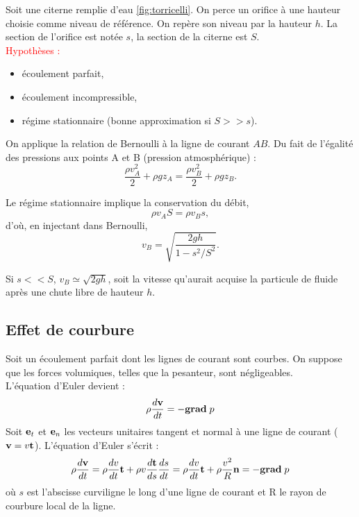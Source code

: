 \documentclass[11pt,a4paper]{report}
\begin{document}
Soit une citerne remplie d'eau \ref{fig:torricelli}. On perce un orifice à une hauteur choisie comme niveau de référence. On repère son niveau par la hauteur $h$. La section  de l'orifice est notée $s$, la section de la citerne est $S$.\\

\textcolor{red}{Hypothèses :}
\begin{itemize}
	\item écoulement parfait,
	\item écoulement incompressible,
	\item régime stationnaire (bonne approximation si $S >> s$).
\end{itemize}

On applique la relation de Bernoulli à la ligne de courant $AB$. Du fait de l'égalité des pressions aux points A et B (pression atmosphérique) :
\begin{equation}
	\frac{\rho v_A^2}{2} + \rho g z_A = \frac{\rho v_B^2}{2} + \rho g z_B.
\end{equation}

Le régime stationnaire implique la conservation du débit,
\begin{equation}
	\rho v_A S = \rho v_B s,
\end{equation}
d'où, en injectant dans Bernoulli,
\begin{equation}
	v_B = \sqrt{\frac{2gh}{1 - s^2/S^2}}.
\end{equation}

Si $s << S$, $v_B \simeq \sqrt{2gh}$, soit la vitesse qu'aurait acquise la particule de fluide après une chute libre de hauteur $h$.

\subsection{Effet de courbure}
Soit un écoulement parfait dont les lignes de courant sont courbes. On suppose que les forces volumiques, telles que la pesanteur, sont négligeables.\\

L'équation d'Euler devient :
\begin{equation}
	\rho \frac{d\bold{v}}{dt} = - \textbf{grad}\;p
\end{equation}
Soit $\bold{e}_t$ et $\bold{e}_n$ les vecteurs unitaires tangent et normal à une ligne de courant ($\bold{v} = v\bold{t}$). L'équation d'Euler s'écrit :
\begin{equation}
	\rho \frac{d\bold{v}}{dt} = \rho \frac{dv}{dt}\bold{t} + \rho v \frac{d\bold{t}}{ds}\frac{ds}{dt} =\rho \frac{dv}{dt}\bold{t} + \rho \frac{v^2}{R}\bold{n} = -\textbf{grad}\;p
\end{equation}
où $s$ est l'abscisse curviligne le long d'une ligne de courant et R le rayon de courbure local de la ligne.\\
\end{document}
